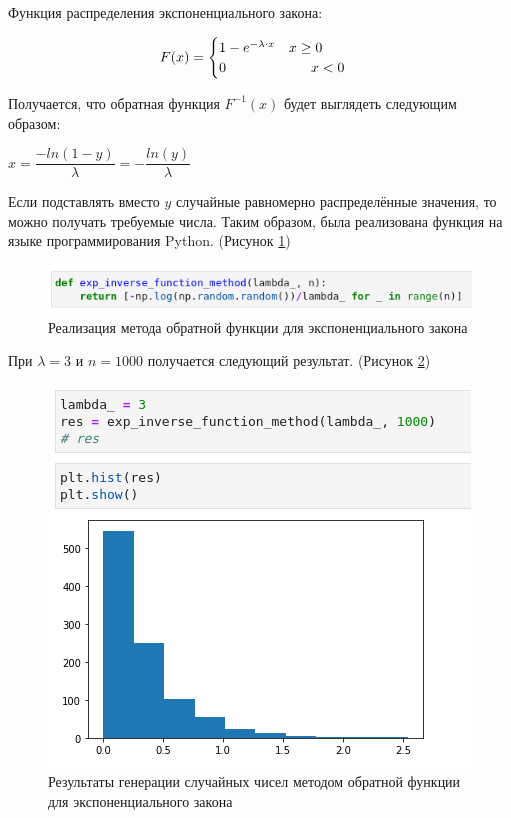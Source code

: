 \documentclass[14pt,fleqn]{extarticle}
\begin{document}
	Функция распределения экспоненциального закона:
	\begin{ceqn}
	\begin{align*}
		F(x) =
		\begin{cases}
			1 - e^{-\lambda \cdot x} \quad x \geq 0\\
			0 \hspace{2.15cm} x < 0
		\end{cases}
	\end{align*}
	\end{ceqn}

	Получается, что обратная функция $F^{-1}(x)$ будет выглядеть следующим образом:
	\begin{center}
		$x = \dfrac{-ln(1-y)}{\lambda} = -\dfrac{ln(y)}{\lambda}$
	\end{center}
	Если подставлять вместо $y$ случайные равномерно распределённые значения, то можно получать требуемые числа.
	\newpage
	Таким образом, была реализована функция на языке программирования Python. (Рисунок \ref{fig:exp_inverse_function_method_code})
	\begin{figure}[h]
		\centering \includegraphics[scale=0.8]{exp_inverse_function_method_code}
		\caption{Реализация метода обратной функции для экспоненциального закона}
		\label{fig:exp_inverse_function_method_code}
	\end{figure}

		При $\lambda = 3$ и $n = 1000$ получается следующий результат. (Рисунок \ref{fig:exp_inverse_function_method_result})
	\begin{figure}[h]
		\centering \includegraphics[scale=0.8]{exp_inverse_function_method_result}
		\caption{Результаты генерации случайных чисел методом обратной функции для экспоненциального закона}
		\label{fig:exp_inverse_function_method_result}
	\end{figure}
\end{document}

